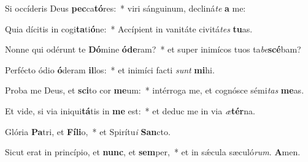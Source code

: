 \item Si occíderis Deus \textbf{pec}ca\textbf{tó}res:~* viri sánguinum, decliná\tinyhspace\textit{te} \textbf{a} me:
\item Quia dícitis in cogi\textbf{ta}ti\textbf{ó}ne:~* Accípient in vanitáte civitá\tinyhspace\textit{tes} \textbf{tu}as.
\item Nonne qui odérunt te \textbf{Dó}mine \textbf{ó}\textbf{de}ram?~* et super inimícos tuos ta\textit{be}\textbf{scé}bam?
\item Perfécto ódio \textbf{ó}deram \textbf{il}los:~* et inimíci fa\-cti \textit{sunt} \textbf{mi}hi.
\item Proba me Deus, et \textbf{sci}to cor \textbf{me}um:~* intérroga me, et cognósce sémi\tinyhspace\textit{tas} \textbf{me}as.
\item Et vide, si via iniqui\textbf{tá}tis in \textbf{me} est:~* et deduc me in via \textit{æ}\textbf{tér}na.
\item Glória \textbf{Pa}tri, et \textbf{Fí}\textbf{li}o,~* et Spirítu\textit{i} \textbf{San}cto.
\item Sicut erat in princípio, et \textbf{nunc}, et \textbf{sem}per,~* et in sǽcula sæculó\textit{rum}. \textbf{A}men.
